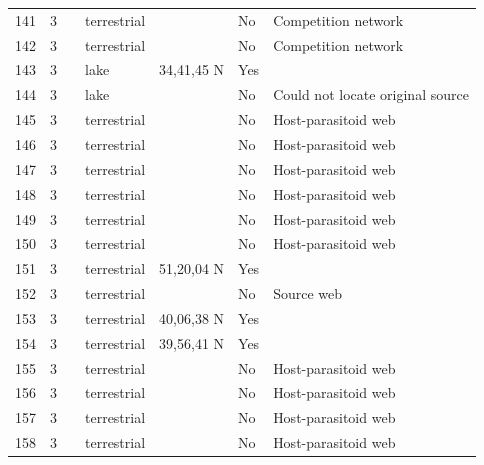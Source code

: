 \documentclass[12pt]{article}
\begin{document}
\begin{landscape}
\begin{table}[h!]
{\begin{tabular}{p{2.8cm}p{1.3cm}p{3cm}p{2.2cm}p{2.5cm}lp{8.2cm}}
        141   & 3 & \cite{Seifert1976}  & terrestrial &       & No    & Competition network \\
        142   & 3 & \cite{Seifert1976}  & terrestrial &       & No    & Competition network \\
        143   & 3 & \cite{Snow1958}    & lake  & 34,41,45 N & Yes   &       \\
        144   & 3 & \cite{Snow1958}  & lake  &       & No    & Could not locate original source \\
        145   & 3 & \cite{Rejmanek1979}  & terrestrial &       & No    & Host-parasitoid web \\
        146   & 3 & \cite{Rejmanek1979}  & terrestrial &       & No    & Host-parasitoid web \\
        147   & 3 & \cite{Rejmanek1979}  & terrestrial &       & No    & Host-parasitoid web \\
        148   & 3 & \cite{Rejmanek1979}  & terrestrial &       & No    & Host-parasitoid web \\
        149   & 3 & \cite{Force1974}    & terrestrial &       & No    & Host-parasitoid web \\
        150   & 3 & \cite{Hopkins1984}     & terrestrial &       & No    & Host-parasitoid web \\
        151   & 3 & \cite{Richards1926}     & terrestrial & 51,20,04 N & Yes   &       \\
        152   & 3 & \cite{Whittaker1984}    & terrestrial &       & No    & Source web \\
        153   & 3 & \cite{Mayse1978}    & terrestrial & 40,06,38 N & Yes   &       \\
        154   & 3 & \cite{Mayse1978}    & terrestrial & 39,56,41 N & Yes   &       \\
        155   & 3 & \cite{Askew1975}     & terrestrial &       & No    & Host-parasitoid web \\
        156   & 3 & \cite{Askew1961}     & terrestrial &       & No    & Host-parasitoid web \\
        157   & 3 & \cite{Askew1961}     & terrestrial &       & No    & Host-parasitoid web \\
        158   & 3 & \cite{Askew1961}     & terrestrial &       & No    & Host-parasitoid web \\
         \hline
      \end{tabular}}%
      \end{table}

        \newpage


\end{landscape}
\end{document}
